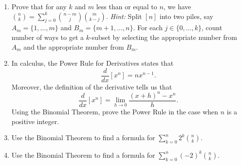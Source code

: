 \documentclass[11pt]{article}%
\theoremstyle{definition}
\begin{document}
\begin{enumerate}
\item Prove that for any $k$ and $m$ less than or equal to $n$, we have $\binom{n}{k}=\sum_{j=0}^k\binom{n-m}{j}\binom{m}{k-j}$. \textit{Hint:} Split $[n]$ into two piles, say $A_m=\{1,\ldots,m\}$ and $B_m=\{m+1,\ldots,n\}$. For each $j\in\{0,\ldots, k\}$, count number of ways to get a $k$-subset by selecting the appropriate number from $A_m$ and the appropriate number from $B_m$.
\item In calculus, the Power Rule for Derivatives states that
\[
\frac{d}{dx}\left[x^n\right]=nx^{n-1}.
\]
Moreover, the definition of the derivative tells us that
\[
\frac{d}{dx}\left[x^n\right]=\lim_{h\to 0}\frac{(x+h)^n-x^n}{h}.
\]
Using the Binomial Theorem, prove the Power Rule in the case when $n$ is a positive integer.
\item Use the Binomial Theorem to find a formula for $\sum_{k=0}^n2^k\binom{n}{k}$.
\item Use the Binomial Theorem to find a formula for $\sum_{k=0}^n(-2)^k\binom{n}{k}$.
\end{enumerate}
\end{document}
